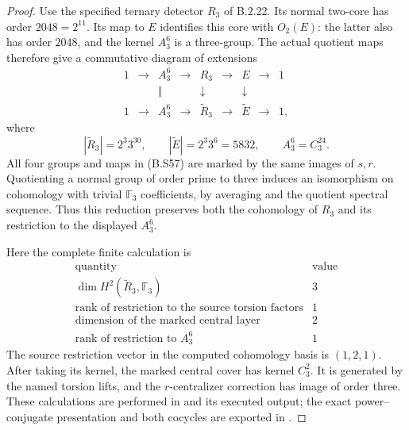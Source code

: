 \begin{proof}
Use the specified ternary detector $R_3$ of B.2.22.
Its normal two-core has order $2048=2^{11}$.
Its map to $E$ identifies this core with $O_2(E)$:
the latter also has order $2048$, and the kernel
$A_3^6$ is a three-group.  The actual quotient maps
therefore give a commutative diagram of extensions
\[
\begin{array}{ccccccccc}
 1&\longrightarrow&A_3^6&\longrightarrow&R_3&\longrightarrow&E&\longrightarrow&1\\
 &&\Vert&&\downarrow&&\downarrow\\
 1&\longrightarrow&A_3^6&\longrightarrow&\widetilde R_3&\longrightarrow&\widetilde E&\longrightarrow&1,
\end{array}                                                     \tag{B.S57}
\]
where
\[
 |\widetilde R_3|=2^3 3^{30},
       \qquad |\widetilde E|=2^3 3^6=5832,
       \qquad A_3^6=C_3^{24}.                                 \tag{B.S58}
\]
All four groups and maps in (B.S57) are marked by
the same images of $s,r$.  Quotienting a normal
group of order prime to three induces an
isomorphism on cohomology with trivial
$\mathbb F_3$ coefficients, by averaging and the
quotient spectral sequence.  Thus this reduction
preserves both the cohomology of $R_3$ and its
restriction to the displayed $A_3^6$.

Here the complete finite calculation is
\[
\begin{array}{c|c}
 \text{quantity}&\text{value}\\ \hline
 \dim H^2(\widetilde R_3,\mathbb F_3)&3\\
 \text{rank of restriction to the source torsion factors}&1\\
 \text{dimension of the marked central layer}&2\\
 \text{rank of restriction to }A_3^6&1
\end{array}                                                     \tag{B.S59}
\]
The source restriction vector in the computed
cohomology basis is $(1,2,1)$.  After taking its
kernel, the marked central cover has kernel
$C_3^2$.  It is generated by the named torsion
lifts, and the $r$-centralizer correction has
image of order three.  These calculations are
performed in
and its executed output; the exact power--conjugate
presentation and both cocycles are exported in
.


\end{proof}
